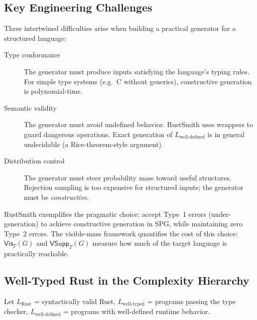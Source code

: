 \documentclass[11pt]{article}
\theoremstyle{remark}
\theoremstyle{definition}
\begin{document}

\subsection{Key Engineering Challenges}\label{sec:eng-challenges}

Three intertwined difficulties arise when building a practical generator for a
structured language:

\begin{description}
  \item[Type conformance] The generator must produce inputs satisfying the
    language's typing rules.  For simple type systems (e.g.\ C without
    generics), constructive generation is polynomial-time.
  \item[Semantic validity] The generator must avoid undefined behavior.
    RustSmith uses wrappers to guard dangerous operations.  Exact generation of
    $L_{\text{well-defined}}$ is in general undecidable (a Rice-theorem-style
    argument).
  \item[Distribution control] The generator must steer probability mass toward
    useful structures.  Rejection sampling is too expensive for structured
    inputs; the generator must be \emph{constructive}.
\end{description}

RustSmith exemplifies the pragmatic choice: accept Type~1 errors
(under-generation) to achieve constructive generation in SPG, while maintaining
zero Type~2 errors.  The visible-mass framework quantifies the cost of this
choice: $\mathsf{Vis}_T(G)$ and $\mathsf{VSupp}_T(G)$ measure how much of the
target language is practically reachable.


\subsection{Well-Typed Rust in the Complexity Hierarchy}\label{sec:rust-hierarchy}

Let $L_{\text{Rust}}$ = syntactically valid Rust, $L_{\text{well-typed}}$ =
programs passing the type checker, $L_{\text{well-defined}}$ = programs with
well-defined runtime behavior.
\end{document}

